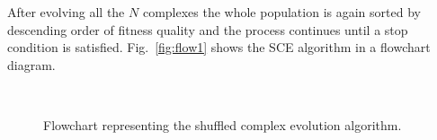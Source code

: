 After evolving all the $N$ complexes the whole population is again
sorted by descending order of fitness quality and the process continues until
a stop condition is satisfied.
Fig.~\ref{fig:flow1} shows the SCE algorithm in a flowchart diagram.

\begin{figure}[htp]
  ~
  \caption{Flowchart representing the shuffled complex evolution algorithm.}
  \label{fig:sce}
\end{figure}


